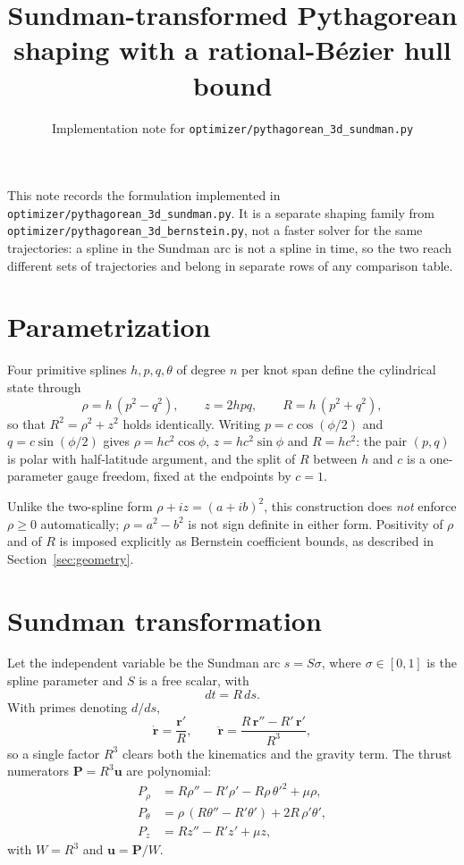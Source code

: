 \documentclass[11pt]{article}
\title{Sundman-transformed Pythagorean shaping with a rational-B\'ezier hull bound}
\author{Implementation note for \texttt{optimizer/pythagorean\_3d\_sundman.py}}
\date{}
\begin{document}
\maketitle

\noindent
This note records the formulation implemented in
\texttt{optimizer/pythagorean\_3d\_sundman.py}. It is a separate shaping family
from \texttt{optimizer/pythagorean\_3d\_bernstein.py}, not a faster solver for the
same trajectories: a spline in the Sundman arc is not a spline in time, so the
two reach different sets of trajectories and belong in separate rows of any
comparison table.

\section{Parametrization}

Four primitive splines $h,p,q,\theta$ of degree $n$ per knot span define the
cylindrical state through
\begin{equation}
  \rho = h\,(p^2-q^2), \qquad z = 2hpq, \qquad R = h\,(p^2+q^2),
\end{equation}
so that $R^2=\rho^2+z^2$ holds identically. Writing $p=c\cos(\phi/2)$ and
$q=c\sin(\phi/2)$ gives $\rho=hc^2\cos\phi$, $z=hc^2\sin\phi$ and $R=hc^2$: the
pair $(p,q)$ is polar with half-latitude argument, and the split of $R$ between
$h$ and $c$ is a one-parameter gauge freedom, fixed at the endpoints by $c=1$.

Unlike the two-spline form $\rho+iz=(a+ib)^2$, this construction does \emph{not}
enforce $\rho\ge 0$ automatically; $\rho=a^2-b^2$ is not sign definite in either
form. Positivity of $\rho$ and of $R$ is imposed explicitly as Bernstein
coefficient bounds, as described in Section~\ref{sec:geometry}.

\section{Sundman transformation}

Let the independent variable be the Sundman arc $s=S\sigma$, where $\sigma\in[0,1]$
is the spline parameter and $S$ is a free scalar, with
\begin{equation}
  dt = R\,ds .
\end{equation}
With primes denoting $d/ds$,
\begin{equation}
  \dot{\mathbf r} = \frac{\mathbf r'}{R},
  \qquad
  \ddot{\mathbf r} = \frac{R\,\mathbf r'' - R'\,\mathbf r'}{R^3},
\end{equation}
so a single factor $R^3$ clears both the kinematics and the gravity term. The
thrust numerators $\mathbf P = R^3\mathbf u$ are polynomial:
\begin{align}
  P_\rho   &= R\rho'' - R'\rho' - R\rho\,\theta'^2 + \mu\rho, \\
  P_\theta &= \rho\,(R\theta'' - R'\theta') + 2R\,\rho'\theta', \\
  P_z      &= R z''   - R' z'   + \mu z,
\end{align}
with $W = R^3$ and $\mathbf u = \mathbf P / W$.
\end{document}
